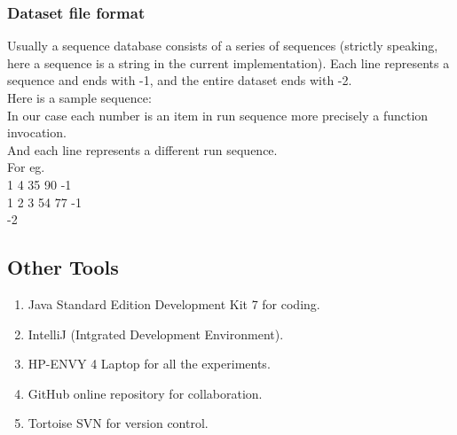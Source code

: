 \subsubsection{Dataset file format}
Usually a sequence database consists of a series of sequences (strictly speaking, here a sequence is a string in the current implementation). Each line represents a sequence and ends with -1, and the entire dataset ends with -2.\\
Here is a sample sequence:\\
In our case each number is an item in run sequence more precisely a function invocation.\\
And each line represents a different run sequence.\\
For eg.\\
1 4 35 90 -1\\
1 2 3 54 77 -1\\
-2

\subsection{Other Tools}
\begin{enumerate}
\item Java Standard Edition Development Kit 7 for coding. 
\item IntelliJ (Intgrated Development Environment).
\item HP-ENVY 4 Laptop for all the experiments.
\item GitHub online repository for collaboration.
\item Tortoise SVN for version control.
\end{enumerate}


